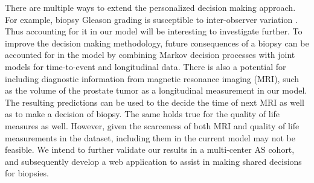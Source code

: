 There are multiple ways to extend the personalized decision making approach. For example, biopsy Gleason grading is susceptible to inter-observer variation \cite{coley2017}. Thus accounting for it in our model will be interesting to investigate further. To improve the decision making methodology, future consequences of a biopsy can be accounted for in the model by combining Markov decision processes with joint models for time-to-event and longitudinal data. There is also a potential for including diagnostic information from magnetic resonance imaging (MRI), such as the volume of the prostate tumor as a longitudinal measurement in our model. The resulting predictions can be used to the decide the time of next MRI as well as to make a decision of biopsy. The same holds true for the quality of life measures as well. However, given the scarceness of both MRI and quality of life measurements in the dataset, including them in the current model may not be feasible. We intend to further validate our results in a multi-center AS cohort, and subsequently develop a web application to assist in making shared decisions for biopsies.